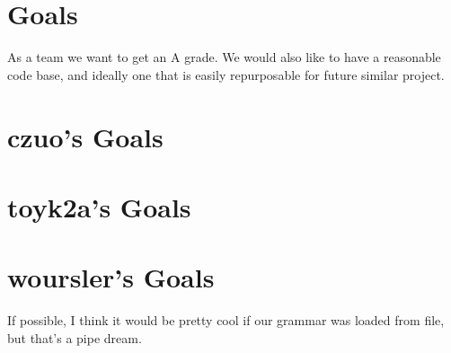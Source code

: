 \section{ Goals }
As a team we want to get an A grade. We would also like to have a reasonable code base, and ideally one that is easily repurposable for future similar project.

\section{ czuo's Goals }
\section{ toyk2a's Goals }
\section{ woursler's Goals }
If possible, I think it would be pretty cool if our grammar was loaded from file, but that's a pipe dream.



